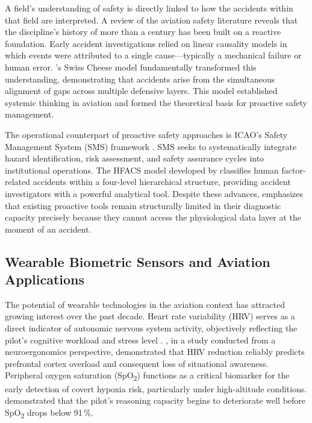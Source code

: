 \documentclass[12pt,a4paper]{article}
\begin{document}
A field's understanding of safety is directly linked to how the accidents within that field
are interpreted. A review of the aviation safety literature reveals that the discipline's
history of more than a century has been built on a reactive foundation. Early accident
investigations relied on linear causality models in which events were attributed to a single
cause---typically a mechanical failure or human error. \citet{reason2000}'s Swiss Cheese model
fundamentally transformed this understanding, demonstrating that accidents arise from the
simultaneous alignment of gaps across multiple defensive layers. This model established systemic
thinking in aviation and formed the theoretical basis for proactive safety management.

The operational counterpart of proactive safety approaches is ICAO's Safety Management System
(SMS) framework \citep{icao2020}. SMS seeks to systematically integrate hazard identification,
risk assessment, and safety assurance cycles into institutional operations. The HFACS model
developed by \citet{shappell2000} classifies human factor-related accidents within a four-level
hierarchical structure, providing accident investigators with a powerful analytical tool. Despite
these advances, \citet{gerede2018} emphasizes that existing proactive tools remain structurally
limited in their diagnostic capacity precisely because they cannot access the physiological data
layer at the moment of an accident.

\subsection{Wearable Biometric Sensors and Aviation Applications}

The potential of wearable technologies in the aviation context has attracted growing interest
over the past decade. Heart rate variability (HRV) serves as a direct indicator of autonomic
nervous system activity, objectively reflecting the pilot's cognitive workload and stress level
\citep{taskforce1996}. \citet{dehais2020}, in a study conducted from a neuroergonomics
perspective, demonstrated that HRV reduction reliably predicts prefrontal cortex overload and
consequent loss of situational awareness. Peripheral oxygen saturation (SpO\textsubscript{2})
functions as a critical biomarker for the early detection of covert hypoxia risk, particularly
under high-altitude conditions. \citet{denison1972} demonstrated that the pilot's reasoning
capacity begins to deteriorate well before SpO\textsubscript{2} drops below 91\,\%.
\end{document}
